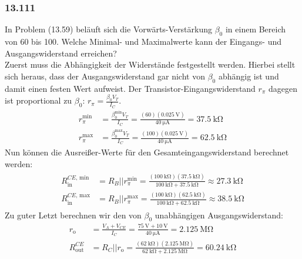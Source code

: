 \documentclass[11pt,a4paper,titlepage]{article}
\begin{document}
\subsubsection*{13.111}
In Problem (13.59) beläuft sich die Vorwärts-Verstärkung $\beta_0$ in einem Bereich von 60 bis 100. Welche Minimal- und Maximalwerte kann der Eingangs- und Ausgangswiderstand erreichen?\\
Zuerst muss die Abhängigkeit der Widerstände festgestellt werden. Hierbei stellt sich heraus, dass der Ausgangswiderstand gar nicht von $\beta_0$ abhängig ist und damit einen festen Wert aufweist. Der Transistor-Eingangswiderstand $r_{\pi}$ dagegen ist proportional zu $\beta_0$: $r_{\pi} = \frac{\beta_0V_T}{I_C}$.
\begin{equation}
\begin{aligned}
r_{\pi}^{\text{min}} &= \frac{\beta_0^{\text{min}}V_T}{I_C} = \frac{(60)(\SI{0.025}{\volt})}{\SI{40}{\micro\ampere}} = \SI{37.5}{\kilo\ohm} \\
r_{\pi}^{\text{max}} &= \frac{\beta_0^{\text{max}}V_T}{I_C} = \frac{(100)(\SI{0.025}{\volt})}{\SI{40}{\micro\ampere}} = \SI{62.5}{\kilo\ohm}
\end{aligned}
\end{equation} 
Nun können die Ausreißer-Werte für den Gesamteingangswiderstand berechnet werden:
\begin{eqnarray}
\begin{aligned}
R_{\text{in}}^{CE\text{, min}} &= R_B || r_{\pi}^{\text{min}} = \frac{(\SI{100}{\kilo\ohm})(\SI{37.5}{\kilo\ohm})}{\SI{100}{\kilo\ohm}+\SI{37.5}{\kilo\ohm}} \approx \SI{27.3}{\kilo\ohm} \\
R_{\text{in}}^{CE\text{, max}} &= R_B || r_{\pi}^{\text{max}} = \frac{(\SI{100}{\kilo\ohm})(\SI{62.5}{\kilo\ohm})}{\SI{100}{\kilo\ohm}+\SI{62.5}{\kilo\ohm}} \approx \SI{38.5}{\kilo\ohm}
\end{aligned}
\end{eqnarray}
Zu guter Letzt berechnen wir den von $\beta_0$ unabhängigen Ausgangswiderstand:
\begin{equation}
\begin{aligned}
r_{\text{o}} &= \frac{V_A+V_{CE}}{I_C} = \frac{\SI{75}{\volt} + \SI{10}{\volt}}{\SI{40}{\micro\ampere}} = \SI{2.125}{\mega\ohm} \\
R_{\text{out}}^{CE} &= R_C || r_{\text{o}} = \frac{(\SI{62}{\kilo\ohm})(\SI{2.125}{\mega\ohm})}{\SI{62}{\kilo\ohm}+\SI{2.125}{\mega\ohm}} = \SI{60.24}{\kilo\ohm}
\end{aligned}
\end{equation}
\end{document}
